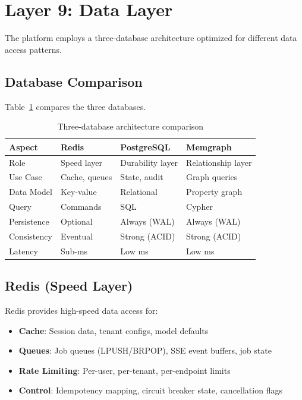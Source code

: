 \documentclass[a4paper,twoside]{sapthesis}
\begin{document}
\section{Layer 9: Data Layer}
\label{sec:layer9-data}

The platform employs a three-database architecture optimized for different data access patterns.

\subsection{Database Comparison}
\label{subsec:db-comparison}

Table~\ref{tab:database-comparison} compares the three databases.

\begin{table}[htbp]
\centering
\caption{Three-database architecture comparison}
\label{tab:database-comparison}
\begin{tabular}{@{}llll@{}}
\toprule
\textbf{Aspect} & \textbf{Redis} & \textbf{PostgreSQL} & \textbf{Memgraph} \\
\midrule
Role & Speed layer & Durability layer & Relationship layer \\
Use Case & Cache, queues & State, audit & Graph queries \\
Data Model & Key-value & Relational & Property graph \\
Query & Commands & SQL & Cypher \\
Persistence & Optional & Always (WAL) & Always (WAL) \\
Consistency & Eventual & Strong (ACID) & Strong (ACID) \\
Latency & Sub-ms & Low ms & Low ms \\
\bottomrule
\end{tabular}
\end{table}

\subsection{Redis (Speed Layer)}
\label{subsec:redis-layer}

Redis provides high-speed data access for:

\begin{itemize}
    \item \textbf{Cache}: Session data, tenant configs, model defaults
    \item \textbf{Queues}: Job queues (LPUSH/BRPOP), SSE event buffers, job state
    \item \textbf{Rate Limiting}: Per-user, per-tenant, per-endpoint limits
    \item \textbf{Control}: Idempotency mapping, circuit breaker state, cancellation flags
\end{itemize}
\end{document}
